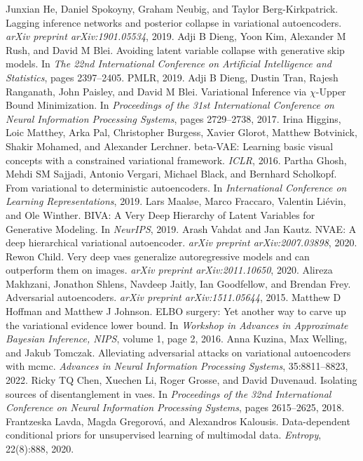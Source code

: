 \begin{chapterreferences}
 Junxian He, Daniel Spokoyny, Graham Neubig, and Taylor Berg-Kirkpatrick. Lagging inference networks and posterior collapse in variational autoencoders. \textit{arXiv preprint arXiv:1901.05534}, 2019.
 Adji B Dieng, Yoon Kim, Alexander M Rush, and David M Blei. Avoiding latent variable collapse with generative skip models. In \textit{The 22nd International Conference on Artificial Intelligence and Statistics}, pages 2397–2405. PMLR, 2019.
 Adji B Dieng, Dustin Tran, Rajesh Ranganath, John Paisley, and David M Blei. Variational Inference via $\chi$-Upper Bound Minimization. In \textit{Proceedings of the 31st International Conference on Neural Information Processing Systems}, pages 2729–2738, 2017.
 Irina Higgins, Loic Matthey, Arka Pal, Christopher Burgess, Xavier Glorot, Matthew Botvinick, Shakir Mohamed, and Alexander Lerchner. beta-VAE: Learning basic visual concepts with a constrained variational framework. \textit{ICLR}, 2016.
 Partha Ghosh, Mehdi SM Sajjadi, Antonio Vergari, Michael Black, and Bernhard Scholkopf. From variational to deterministic autoencoders. In \textit{International Conference on Learning Representations}, 2019.
 Lars Maaløe, Marco Fraccaro, Valentin Liévin, and Ole Winther. BIVA: A Very Deep Hierarchy of Latent Variables for Generative Modeling. In \textit{NeurIPS}, 2019.
 Arash Vahdat and Jan Kautz. NVAE: A deep hierarchical variational autoencoder. \textit{arXiv preprint arXiv:2007.03898}, 2020.
 Rewon Child. Very deep vaes generalize autoregressive models and can outperform them on images. \textit{arXiv preprint arXiv:2011.10650}, 2020.
 Alireza Makhzani, Jonathon Shlens, Navdeep Jaitly, Ian Goodfellow, and Brendan Frey. Adversarial autoencoders. \textit{arXiv preprint arXiv:1511.05644}, 2015.
 Matthew D Hoffman and Matthew J Johnson. ELBO surgery: Yet another way to carve up the variational evidence lower bound. In \textit{Workshop in Advances in Approximate Bayesian Inference, NIPS}, volume 1, page 2, 2016.
 Anna Kuzina, Max Welling, and Jakub Tomczak. Alleviating adversarial attacks on variational autoencoders with mcmc. \textit{Advances in Neural Information Processing Systems}, 35:8811–8823, 2022.
 Ricky TQ Chen, Xuechen Li, Roger Grosse, and David Duvenaud. Isolating sources of disentanglement in vaes. In \textit{Proceedings of the 32nd International Conference on Neural Information Processing Systems}, pages 2615–2625, 2018.
 Frantzeska Lavda, Magda Gregorová, and Alexandros Kalousis. Data-dependent conditional priors for unsupervised learning of multimodal data. \textit{Entropy}, 22(8):888, 2020.

\end{chapterreferences}
